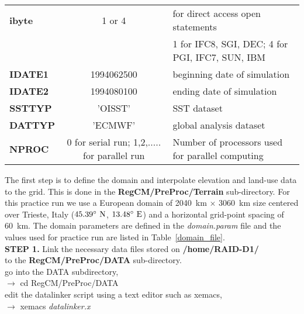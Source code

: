 \begin{table}[h]
\begin{center}
\begin{tabular}{|l|c|l|}
{\footnotesize {\bf ibyte}} & {\footnotesize {1 or 4}}  & {\footnotesize for direct access open statements} \\  
 & & {\footnotesize  1 for IFC8, SGI, DEC;  4 for PGI, IFC7, SUN, IBM} \\ \hline
{\footnotesize {\bf IDATE1}}   & {\footnotesize {1994062500}} & {\footnotesize beginning date of simulation} \\ \hline
{\footnotesize {\bf IDATE2}}   & {\footnotesize {1994080100}} & {\footnotesize ending date of simulation} \\ \hline
{\footnotesize {\bf SSTTYP}}   & {\footnotesize {'OISST'}} & {\footnotesize SST dataset }\\ \hline
{\footnotesize {\bf DATTYP}}   & {\footnotesize {'ECMWF'}} & {\footnotesize global analysis dataset} \\ \hline
{\footnotesize {\bf NPROC}}   & {\footnotesize {0 for serial run;  1,2,..... for parallel run}} & {\footnotesize Number of processors used for parallel computing} \\ \hline
\end{tabular}
\end{center}
\end{table}


\noindent
The first step is to define the domain and interpolate elevation and land-use data to the
grid.  This is done in the {\bf RegCM/PreProc/Terrain} sub-directory.  For this practice run we 
use a European domain of 2040~km $\times$ 3060~km size centered over Trieste, 
Italy ($45.39^{\circ}~{\rm N}$, $ 13.48^{\circ}~{\rm E}$) and a horizontal grid-point
spacing of 60~km.  The domain parameters are defined in the {\it domain.param} file and  
the values used for practice run are listed in Table~\ref{domain_file}. \\

\noindent
{\bf STEP 1.}  Link the necessary data files stored on {\bf /home/RAID-D1/} \\
 to the {\bf RegCM/PreProc/DATA} sub-directory. \\ 

\noindent
go into the DATA subdirectory, \\

\indent 
$\rightarrow$ cd RegCM/PreProc/DATA \\ 

\noindent
edit the datalinker script using a text editor such as xemacs, \\

\indent
$\rightarrow$ xemacs {\it datalinker.x} \\ 

